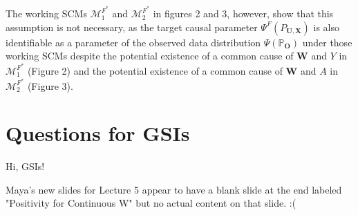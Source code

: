 \documentclass{article}\usepackage[]{graphicx}\usepackage[]{xcolor}
\begin{document}
The working SCMs $\mathcal{M}^{F^*}_1$ and $\mathcal{M}^{F^*}_2$ in figures 2 and 3, however, show that this assumption is not necessary, as the target causal parameter $\Psi^F(P_{\bm{U},\bm{X}})$ is also identifiable as a parameter of the observed data distribution $\Psi(\mathbb{P}_{\bm{O}})$ under those working SCMs despite the potential existence of a common cause of $\bm{W}$ and $Y$ in $\mathcal{M}^{F^*}_1$ (Figure 2) and the potential existence of a common cause of $\bm{W}$ and $A$ in $\mathcal{M}^{F^*}_2$ (Figure 3).

\vspace{2mm}

\setlength{\leftskip}{0cm}

\section{Questions for GSIs}

Hi, GSIs!

Maya's new slides for Lecture 5 appear to have a blank slide at the end labeled "Positivity for Continuous W" but no actual content on that slide. :(
      
\end{document}
